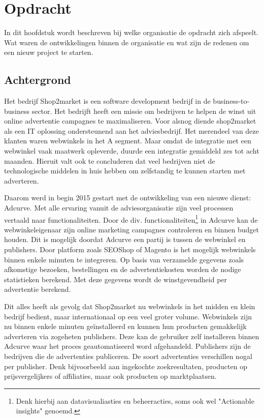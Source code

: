 
\chapter{Opdracht}

In dit hoofdstuk wordt beschreven bij welke organisatie de opdracht zich afspeelt. Wat waren de ontwikkelingen binnen de organisatie en wat zijn de redenen om een nieuw project te starten.

\section{Achtergrond}

Het bedrijf Shop2market is een software development bedrijf in de business-to-business sector. Het bedrijft heeft een missie om bedrijven te helpen de winst uit online advertentie campagnes te maximaliseren. 
Voor alsnog diende shop2market als een IT oplossing ondersteunend aan het adviesbedrijf. Het merendeel van deze klanten waren webwinkels in het A segment. Maar omdat de integratie met een webwinkel vaak maatwerk opleverde, duurde een integratie gemiddeld zes tot acht maanden. Hieruit valt ook te concluderen dat veel bedrijven niet de technologische middelen in huis hebben om zelfstandig te kunnen starten met adverteren.

Daarom werd in begin 2015 gestart met de ontwikkeling van een nieuwe dienst: Adcurve. Met alle ervaring vanuit de adviesorganisatie zijn veel processen vertaald naar functionaliteiten. Door de div. functionaliteiten\footnote{ Denk hierbij aan datavisualiasties en beheeracties, soms ook wel "Actionable insights" genoemd.} in Adcurve kan de webwinkeleigenaar zijn online marketing campagnes controleren en binnen budget houden. Dit is mogelijk doordat Adcurve een partij is tussen de webwinkel en publishers. Door platform zoals SEOShop of Magento is het mogelijk webwinkels binnen enkele minuten te integreren. 
Op basis van verzamelde gegevens zoals afkomstige bezoeken, bestellingen en de advertentiekosten worden de nodige statistieken berekend. Met deze gegevens wordt de winstgevendheid per advertentie berekend.


Dit alles heeft als gevolg dat Shop2market nu webwinkels in het midden en klein bedrijf  bedient, maar internationaal op een veel groter volume. Webwinkels zijn nu binnen enkele minuten geïnstalleerd en kunnen hun producten gemakkelijk adverteren via zogeheten publishers. Deze kan de gebruiker zelf installeren binnen Adcurve waar het proces geautomatiseerd word afgehandeld. Publishers zijn de bedrijven die de advertenties publiceren. De soort advertenties verschillen nogal per publisher. Denk bijvoorbeeld aan ingekochte zoekresultaten, producten op prijsvergelijkers of affiliaties, maar ook producten op marktplaatsen.


